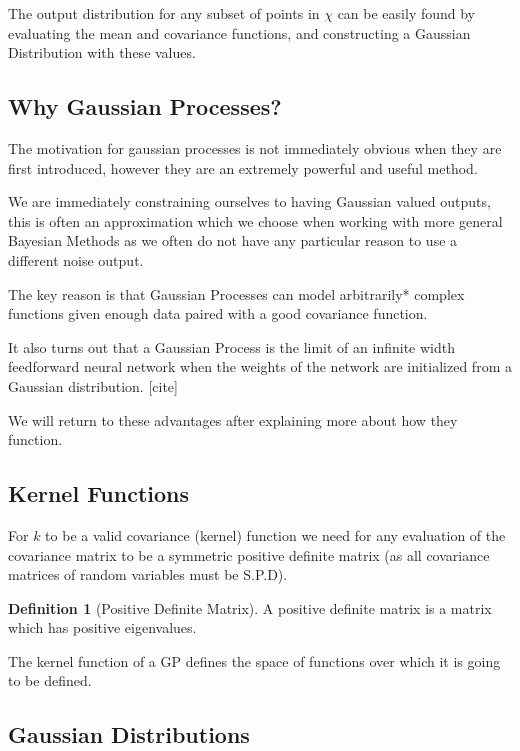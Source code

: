 \documentclass[12pt, a4paper]{report}
\theoremstyle{definition}
\theoremstyle{definition}
\newtheorem{definition}{Definition}[section]
\theoremstyle{definition}
\begin{document}
The output distribution for any subset of points in $\chi$ can be easily found by evaluating the mean and covariance functions, and constructing a Gaussian Distribution with these values.


\subsection{Why Gaussian Processes?}

The motivation for gaussian processes is not immediately obvious when they are first introduced, however they are an extremely powerful and useful method.

We are immediately constraining ourselves to having Gaussian valued outputs, this is often an approximation which we choose when working with more general Bayesian Methods as we often do not have any particular reason to use a different noise output.

The key reason is that Gaussian Processes can model arbitrarily* complex functions given enough data paired with a good covariance function.

It also turns out that a Gaussian Process is the limit of an infinite width feedforward neural network when the weights of the network are initialized from a Gaussian distribution. [cite]

We will return to these advantages after explaining more about how they function.

\subsection{Kernel Functions}

For $k$ to be a valid covariance (kernel) function we need for any evaluation of the covariance matrix to be a symmetric positive definite matrix (as all covariance matrices of random variables must be S.P.D).

\begin{definition}[Positive Definite Matrix]
    A positive definite matrix is a matrix which has positive eigenvalues.
\end{definition}

The kernel function of a GP defines the space of functions over which it is going to be defined.

\subsection{Gaussian Distributions}
\end{document}
